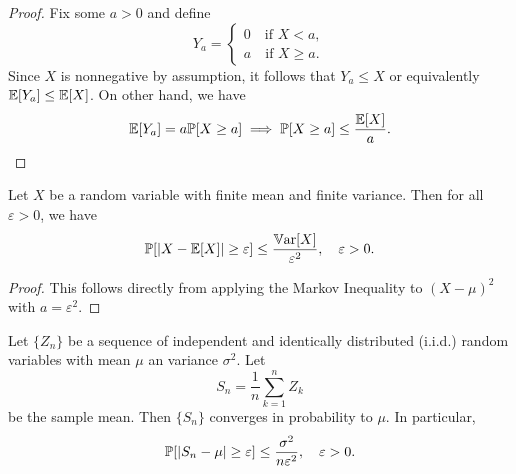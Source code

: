 \documentclass[11pt,a4paper]{article}
\begin{document}
\begin{proof}
    Fix some $a > 0$ and define 
    \begin{equation*}
        Y_a = \begin{cases}
            0\quad\text{if } X<a, \\
            a\quad\text{if } X\ge a.
        \end{cases}
    \end{equation*}
    Since $X$ is nonnegative by assumption, it follows that $Y_a \le X$ or equivalently $\mathbb{E}[Y_a] \le \mathbb{E}[X]$. On other hand, we have
    \begin{equation*}
        \mathbb{E}[Y_a] = a \mathbb{P}[X \ge a] \implies \mathbb{P}[X\ge a] \le \dfrac{\mathbb{E}[X]}{a}. 
    \end{equation*}
\end{proof}

\begin{lemma}
    Let $X$ be a random variable with finite mean and finite variance. Then for all $\varepsilon>0$, we have
    \begin{equation*}
        \mathbb{P}[|X-\mathbb{E}[X]|\ge \varepsilon] \le \dfrac{\mathbb{V}\text{ar}[X]}{\varepsilon^2},\quad \varepsilon > 0.
    \end{equation*}
\end{lemma}

\begin{proof}
    This follows directly from applying the Markov Inequality to $(X-\mu)^2$ with $a = \varepsilon^2$. 
\end{proof}

\begin{lemma}
    Let $\{Z_n\}$ be a sequence of independent and identically distributed (i.i.d.) random variables with mean $\mu$ an variance $\sigma^2$. Let 
    \begin{equation*}
        S_n = \dfrac{1}{n}\sum_{k=1}^n Z_k
    \end{equation*}
    be the sample mean. Then $\{S_n\}$ converges in probability to $\mu$. In particular, 
    \begin{equation*}
        \mathbb{P}[|S_n-\mu|\ge \varepsilon] \le \dfrac{\sigma^2}{n\varepsilon^2},\quad \varepsilon > 0.
    \end{equation*}
\end{lemma}
\end{document}
